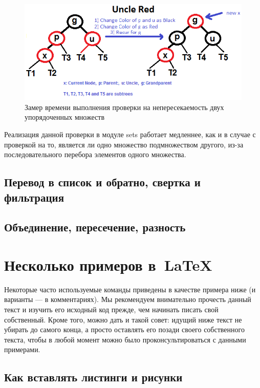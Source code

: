 		\begin{figure}[H]
				\centering
				\includegraphics[width=\textwidth]{img/tan-aus.png}
				\caption{Замер времени выполнения проверки на непересекаемость двух упорядоченных множеств}
		\end{figure}
		Реализация данной проверки в модуле sets работает медленнее, как и в случае с проверкой на то, 
		является ли одно множество подмножеством другого, из-за последовательного перебора элементов одного множества.
				
	
	\subsection{Перевод в список и обратно, свертка и фильтрация}
	\subsection{Объединение, пересечение, разность}




\section{Несколько примеров в~\LaTeX{}}
\label{sec:examples}

Некоторые часто используемые
команды приведены в качестве примера ниже (и варианты — в
комментариях). Мы рекомендуем внимательно прочесть данный
текст и изучить его исходный код прежде, чем начинать писать
свой собственный. Кроме того, можно дать и такой совет: идущий
ниже текст не убирать до самого конца, а просто оставлять его
позади своего собственного текста, чтобы в любой момент можно
было проконсультироваться с данными примерами.

\subsection{Как вставлять листинги и рисунки}


